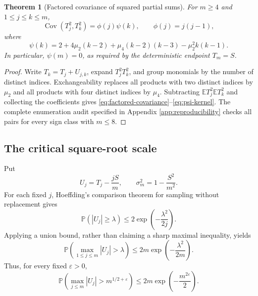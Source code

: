 \documentclass[11pt,reqno]{amsart}
\numberwithin{equation}{section}
\theoremstyle{plain}
\newtheorem{theorem}{Theorem}[section]
\theoremstyle{definition}
\theoremstyle{remark}
\newcommand{\E}{\mathbb E}
\newcommand{\Prob}{\mathbb P}
\newcommand{\Cov}{\operatorname{Cov}}
\newcommand{\eps}{\varepsilon}
\begin{document}
\begin{theorem}[Factored covariance of squared partial sums]
\label{thm:factored-covariance}
For \(m\geq4\) and \(1\leq j\leq k\leq m\),
\begin{equation}
\Cov(T_j^2,T_k^2)=\phi(j)\psi(k),
\qquad \phi(j)=j(j-1),
\label{eq:factored-covariance}
\end{equation}
where
\begin{equation}
\psi(k)=2+4\mu_2(k-2)+\mu_4(k-2)(k-3)
-\mu_2^2k(k-1).
\label{eq:psi-kernel}
\end{equation}
In particular, \(\psi(m)=0\), as required by the deterministic endpoint
\(T_m=S\).
\end{theorem}

\begin{proof}
Write \(T_k=T_j+U_{j,k}\), expand \(T_j^2T_k^2\), and group monomials by the
number of distinct indices.  Exchangeability replaces all products with two
distinct indices by \(\mu_2\) and all products with four distinct indices by
\(\mu_4\).  Subtracting
\(\E T_j^2\E T_k^2\) and collecting the coefficients gives
\eqref{eq:factored-covariance}--\eqref{eq:psi-kernel}.  The complete
enumeration audit specified in Appendix \ref{app:reproducibility} checks all
pairs for every sign class with \(m\leq8\).
\end{proof}

\subsection{The critical square-root scale}
\label{subsec:critical-scale}

Put
\begin{equation}
U_j=T_j-\frac{jS}{m},\qquad
\sigma_m^2=1-\frac{S^2}{m^2}.
\label{eq:centered-bridge}
\end{equation}
For each fixed \(j\), Hoeffding's comparison theorem for sampling without
replacement gives
\begin{equation}
\Prob\left(\left|U_j\right|\geq\lambda\right)
\leq2\exp\left(-\frac{\lambda^2}{2j}\right).
\label{eq:pointwise-hoeffding}
\end{equation}
Applying a union bound, rather than claiming a sharp maximal inequality,
yields
\begin{equation}
\Prob\left(\max_{1\leq j\leq m}|U_j|>\lambda\right)
\leq2m\exp\left(-\frac{\lambda^2}{2m}\right).
\label{eq:union-maximal-bound}
\end{equation}
Thus, for every fixed \(\eps>0\),
\begin{equation}
\Prob\left(\max_{j\leq m}|U_j|>m^{1/2+\eps}\right)
\leq2m\exp\left(-\frac{m^{2\eps}}{2}\right).
\label{eq:superpolynomial-critical-bound}
\end{equation}
\end{document}
